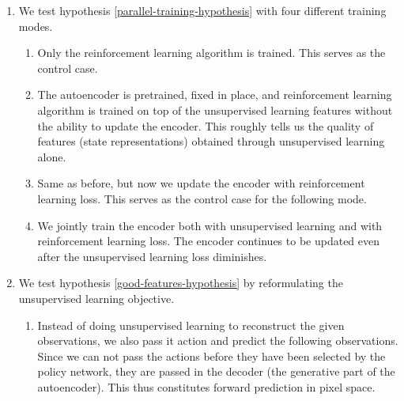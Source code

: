 \begin{enumerate}
		\item We test hypothesis \ref{parallel-training-hypothesis} with four different training modes.
		\begin{enumerate}
				\item Only the reinforcement learning algorithm is trained. This serves as 
						the control case.
				\item The autoencoder is pretrained, fixed in place, and reinforcement learning
						algorithm is trained on top of the unsupervised learning features
						without the ability to update the encoder. 
						This roughly tells us the quality of features (state representations) 
						obtained through unsupervised learning alone. \label{test-ae-fixed}
				\item Same as before, but now we update the encoder with reinforcement learning loss.
						This serves as the control case for the following mode.
				\item We jointly train the encoder both with unsupervised learning and with
						reinforcement learning loss. The encoder continues to be updated
						even after the unsupervised learning loss diminishes.
		\end{enumerate}
\item We test hypothesis \ref{good-features-hypothesis} by reformulating the unsupervised learning objective.
		\begin{enumerate}
				\item Instead of doing unsupervised learning to reconstruct the given observations,
						we also pass it action and predict the following observations.
						Since we can not pass the actions before they have been selected by the policy network,
						they are passed in the decoder (the generative part of the autoencoder).
						This thus constitutes forward prediction in pixel space.

\end{enumerate}
\end{enumerate}
